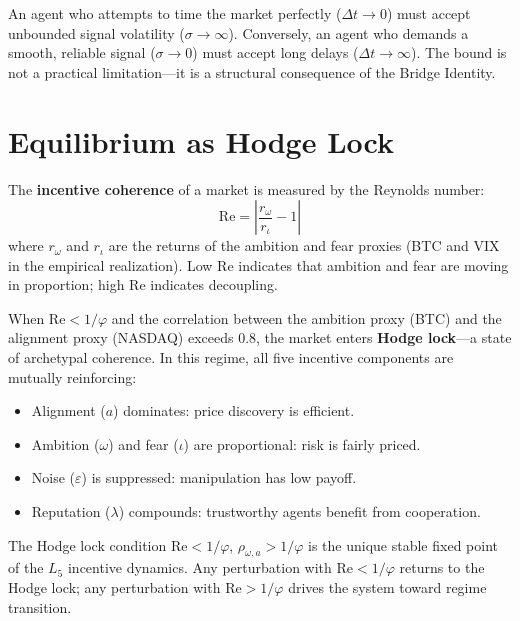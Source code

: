 An agent who attempts to time the market perfectly ($\Delta t \to 0$) must accept unbounded signal volatility ($\sigma \to \infty$). Conversely, an agent who demands a smooth, reliable signal ($\sigma \to 0$) must accept long delays ($\Delta t \to \infty$). The bound is not a practical limitation---it is a structural consequence of the Bridge Identity.

\section{Equilibrium as Hodge Lock}

\begin{definition}\label{def:coherence}
The \textbf{incentive coherence} of a market is measured by the Reynolds number:
\begin{equation}
    \mathrm{Re} = \left|\frac{r_\omega}{r_\iota} - 1\right|
\end{equation}
where $r_\omega$ and $r_\iota$ are the returns of the ambition and fear proxies (BTC and VIX in the empirical realization). Low Re indicates that ambition and fear are moving in proportion; high Re indicates decoupling.
\end{definition}

When $\mathrm{Re} < 1/\varphi$ and the correlation between the ambition proxy (BTC) and the alignment proxy (NASDAQ) exceeds 0.8, the market enters \textbf{Hodge lock}---a state of archetypal coherence. In this regime, all five incentive components are mutually reinforcing:

\begin{itemize}[noitemsep]
    \item Alignment ($a$) dominates: price discovery is efficient.
    \item Ambition ($\omega$) and fear ($\iota$) are proportional: risk is fairly priced.
    \item Noise ($\varepsilon$) is suppressed: manipulation has low payoff.
    \item Reputation ($\lambda$) compounds: trustworthy agents benefit from cooperation.
\end{itemize}

\begin{theorem}\label{thm:hodge_eq}
The Hodge lock condition $\mathrm{Re} < 1/\varphi$, $\rho_{\omega,a} > 1/\varphi$ is the unique stable fixed point of the $L_5$ incentive dynamics. Any perturbation with $\mathrm{Re} < 1/\varphi$ returns to the Hodge lock; any perturbation with $\mathrm{Re} > 1/\varphi$ drives the system toward regime transition.
\end{theorem}

